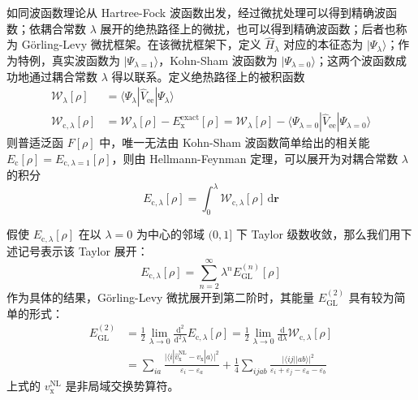 如同波函数理论从 Hartree-Fock 波函数出发，经过微扰处理可以得到精确波函数；依耦合常数 $\lambda$ 展开的绝热路径上的微扰，也可以得到精确波函数；后者也称为 G\"orling-Levy 微扰框架\cite{Goerling-Levy.PRB.1993, Goerling-Levy.PRA.1994}。在该微扰框架下，定义 $\hat H_\lambda$ 对应的本征态为 $| \Psi_\lambda \rangle$；作为特例，真实波函数为 $| \Psi_{\lambda = 1} \rangle$，Kohn-Sham 波函数为 $| \Psi_{\lambda = 0} \rangle$；这两个波函数成功地通过耦合常数 $\lambda$ 得以联系。定义绝热路径上的被积函数
\begin{align}
  \mathcal{W}_{\lambda} [\rho] &= \langle \Psi_\lambda | \hat V_\mathrm{ee} | \Psi_\lambda \rangle \\
  \mathcal{W}_{\mathrm{c}, \lambda} [\rho] &= \mathcal{W}_{\lambda} [\rho] - E_\mathrm{x}^\mathrm{exact} [\rho] = \mathcal{W}_{\lambda} [\rho] - \langle \Psi_{\lambda = 0} | \hat V_\mathrm{ee} | \Psi_{\lambda = 0} \rangle
\end{align}
则普适泛函 $F[\rho]$ 中，唯一无法由 Kohn-Sham 波函数简单给出的相关能 $E_\mathrm{c} [\rho] = E_{\mathrm{c}, \lambda=1} [\rho]$，则由 Hellmann-Feynman 定理，可以展开为对耦合常数 $\lambda$ 的积分
\begin{equation}
  E_{\mathrm{c}, \lambda} [\rho] = \int_0^\lambda \mathcal{W}_{\mathrm{c}, \lambda} [\rho] \, \mathrm{d} \bm{r}
\end{equation}

假使 $E_{\mathrm{c}, \lambda} [\rho]$ 在以 $\lambda=0$ 为中心的邻域 $(0, 1]$ 下 Taylor 级数收敛，那么我们用下述记号表示该 Taylor 展开：
\begin{equation}
  \label{eq.2.e-c-lambda}
  E_{\mathrm{c}, \lambda} [\rho] = \sum_{n=2}^{\infty} \lambda^n E_\mathrm{GL}^{(n)} [\rho]
\end{equation}
作为具体的结果，G\"orling-Levy 微扰展开到第二阶时，其能量 $E_\mathrm{GL}^{(2)}$ 具有较为简单的形式：
\begin{align}
  \label{eq.2.GL2-W}
  E_\mathrm{GL}^{(2)} &= \frac{1}{2} \lim_{\lambda \rightarrow 0} \frac{\mathrm{d}^2}{\mathrm{d}^2 \lambda} E_{\mathrm{c}, \lambda} [\rho] = \frac{1}{2} \lim_{\lambda \rightarrow 0} \frac{\mathrm{d}}{\mathrm{d} \lambda} \mathcal{W}_{\mathrm{c}, \lambda} [\rho] \\
  \label{eq.2.GL2-def}
  &= \sum_{ia} \frac{\big| \langle i | \hat v_\mathrm{x}^\mathrm{NL} - v_\mathrm{x} | a \rangle \big|^2}{\varepsilon_i - \varepsilon_a} + \frac{1}{4} \sum_{ijab} \frac{\big| \langle ij || ab \rangle \big|^2}{\varepsilon_i + \varepsilon_j - \varepsilon_a - \varepsilon_b}
\end{align}
上式的 $v_\mathrm{x}^\mathrm{NL}$ 是非局域交换势算符。

